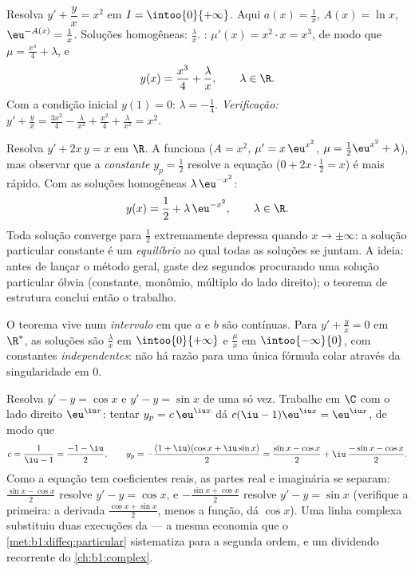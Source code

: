 \begin{example}\label{ex:b1:diffeq:order1}
Resolva $y' + \dfrac{y}{x} = x^2$ em $I = \intoo{0}{+\infty}$. Aqui
$a(x) = \frac 1x$, $A(x) = \ln x$, $\eu^{-A(x)} = \frac 1x$.
Soluções homogêneas: $\frac{\lambda}{x}$. :
$\mu'(x) = x^2 \cdot x = x^3$, de modo que $\mu = \frac{x^4}{4} + \lambda$, e
\[
y(x) = \frac{x^3}{4} + \frac{\lambda}{x}, \qquad \lambda \in \R .
\]
Com a condição inicial $y(1) = 0$: $\lambda = -\frac14$.
\emph{Verificação:} $y' + \frac yx = \frac{3x^2}{4} - \frac{\lambda}{x^2} +
\frac{x^2}{4} + \frac{\lambda}{x^2} = x^2$.
\end{example}

\begin{example}\label{ex:b1:diffeq:guess}
Resolva $y' + 2x\,y = x$ em $\R$. A  funciona ($A =
x^2$, $\mu' = x\,\eu^{x^2}$, $\mu = \frac12\eu^{x^2} + \lambda$),
mas observar que a \emph{constante} $y_p = \frac12$ resolve a
equação ($0 + 2x\cdot\frac12 = x$) é mais rápido. Com as
soluções homogêneas $\lambda\,\eu^{-x^2}$:
\[
y(x) = \frac12 + \lambda\,\eu^{-x^2}, \qquad \lambda \in \R .
\]
Toda solução converge para $\frac12$ extremamente depressa quando $x \to
\pm\infty$: a solução particular constante é um
\emph{equilíbrio} ao qual todas as soluções se juntam. A ideia: antes
de lançar o método geral, gaste dez segundos procurando uma
solução particular óbvia (constante, monômio, múltiplo do
lado direito); o teorema de estrutura conclui então o trabalho.
\end{example}

\begin{remark}
O teorema vive num \emph{intervalo} em que $a$ e $b$ são
contínuas. Para $y' + \frac yx = 0$ em $\R^*$, as soluções são
$\frac{\lambda}{x}$ em $\intoo{0}{+\infty}$ e
$\frac{\mu}{x}$ em $\intoo{-\infty}{0}$, com constantes
\emph{independentes}: não há razão para uma única fórmula colar através
da singularidade em $0$.
\end{remark}

\begin{example}\label{ex:b1:diffeq:complexrhs}
Resolva $y' - y = \cos x$ e $y' - y = \sin x$ de uma só vez. Trabalhe
em $\C$ com o lado direito $\eu^{\iu x}$: tentar $y_p =
c\,\eu^{\iu x}$ dá $c(\iu - 1)\eu^{\iu x} = \eu^{\iu x}$, de modo que
\[
c = \frac1{\iu - 1} = \frac{-1 - \iu}2,
\qquad
y_p = -\frac{(1 + \iu)(\cos x + \iu\sin x)}2
= \frac{\sin x - \cos x}2 + \iu\,\frac{-\sin x - \cos x}2 .
\]
Como a equação tem coeficientes reais, as partes real e imaginária
se separam: $\frac{\sin x - \cos x}2$ resolve $y' - y = \cos x$,
e $-\frac{\sin x + \cos x}2$ resolve $y' - y = \sin x$ (verifique
a primeira: a derivada $\frac{\cos x + \sin x}2$, menos a
função, dá $\cos x$). Uma linha complexa substituiu duas execuções da
 --- a mesma economia que o
\cref{met:b1:diffeq:particular} sistematiza para a segunda ordem,
e um dividendo recorrente do \cref{ch:b1:complex}.
\end{example}

